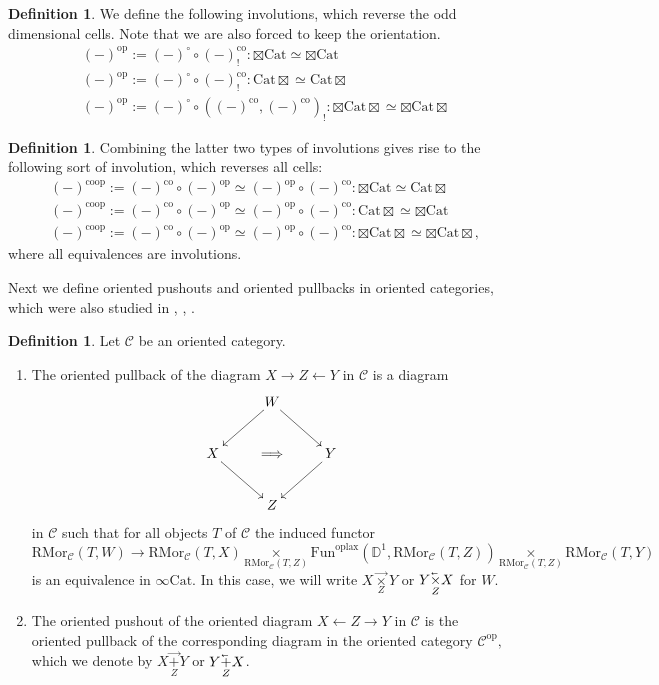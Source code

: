 \documentclass[10pt,oneside]{article}
\newcommand{\cev}[1]{\reflectbox{\ensuremath{\vec{\reflectbox{\ensuremath{#1}}}}}}
\numberwithin{equation}{section} %
\numberwithin{figure}{section} %
\theoremstyle{plain}
\theoremstyle{definition}
\newtheorem{definition}[theorem]{Definition}
\newcommand{\bD}{{\mathbb D}}
\newcommand{\mC}{{\mathcal C}}
\newcommand{\R}{{\mathrm R}}
\newcommand{\op}{\mathrm{op}}
\newcommand{\co}{\mathrm{co}}
\newcommand{\Cat}{\mathrm{Cat}}
\newcommand{\Fun}{\mathrm{Fun}}
\newcommand{\oplax}{{\mathrm{oplax}}}
\newcommand{\Mor}{{\mathrm{Mor}}}
\begin{document}
\begin{definition}
We define the following involutions, which reverse the odd dimensional cells.
Note that we are also forced to keep the orientation.
\begin{align*}
&(-)^\op:= (-)^\circ\circ (-)^\co_!: {\boxtimes\Cat} \simeq {\boxtimes\Cat}\\
&(-)^\op:= (-)^\circ\circ (-)^\co_!: {\Cat\boxtimes} \simeq {\Cat\boxtimes}\\
&(-)^\op :=(-)^\circ \circ ((-)^\co, (-)^\co)_!: {\boxtimes\Cat\boxtimes} \simeq {\boxtimes\Cat\boxtimes}
\end{align*}
\end{definition}

\begin{definition}
Combining the latter two types of involutions gives rise to the following sort of involution, which reverses all cells:
\begin{align*}
&{(-)^{\co\op}}:= {(-)^{\co}} \circ {(-)^{\op}} \simeq {(-)^{\op}} \circ{(-)^{\co}}:{\boxtimes\Cat} \simeq {\Cat\boxtimes}\\
&{(-)^{\co\op}}:= {(-)^{\co}} \circ {(-)^{\op}} \simeq {(-)^{\op}} \circ {(-)^{\co}}:{\Cat\boxtimes} \simeq {\boxtimes\Cat}\\
&{(-)^{\co\op}}:= {(-)^{\co}} \circ {(-)^{\op}} \simeq {(-)^{\op}} \circ {(-)^{\co}}: {\boxtimes\Cat\boxtimes} \simeq {\boxtimes\Cat\boxtimes},
\end{align*}
where all equivalences are involutions.
\end{definition}

Next we define oriented pushouts and oriented pullbacks in oriented categories, which were also studied in \cite[3.8.]{oriented}, \cite[3.3.]{heine2025categorification}, \cite[4.3.]{heine2026stable}.

\begin{definition}
Let $\mC$ be an oriented category.
\begin{enumerate}[\normalfont(1)]\setlength{\itemsep}{-2pt}
\item 
The oriented pullback of the diagram $X \to Z\leftarrow Y$ in $\mC$ is a diagram
\[
\xymatrix{& W\ar[rd]\ar[ld] &\\
X\ar[rd] & \Longrightarrow & Y\ar[ld]\\
& Z &}
\]
in $\mC$ such that for all objects $T$ of $\mC$ the induced functor
\[
\R\Mor_{\mC}(T,W)\to \R\Mor_{\mC}(T,X) \underset{\R\Mor_{\mC}(T,Z)}{\times}
\Fun^\oplax(\bD^1,\R\Mor_{\mC}(T,Z)) \underset{\R\Mor_{\mC}(T,Z)}{\times} \R\Mor_{\mC}(T,Y)
\]
is an equivalence in $\infty\Cat$.
In this case, we will write $X\underset{Z}{\vec{\times}} Y$ or $ Y\underset{Z}{{\cev\times}} X$ for $W.$


\item 
The oriented pushout of the oriented diagram $X \leftarrow Z\to Y$ in $\mC$ is the oriented pullback of the corresponding diagram in the oriented category $\mC^\op,$ which we denote by $ X\underset{Z}{{\vec{+}}} Y $ or $Y\underset{Z}{\cev{+}} X$.

\end{enumerate}

\end{definition}
\end{document}
